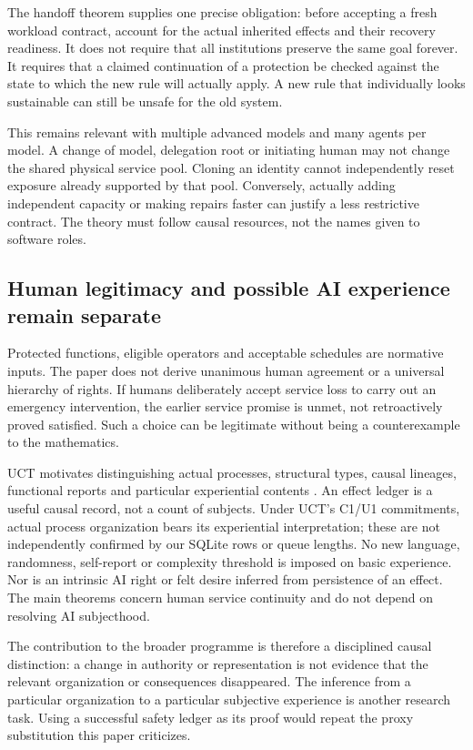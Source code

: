 The handoff theorem supplies one precise obligation: before accepting a fresh workload contract, account for the actual inherited effects and their recovery readiness. It does not require that all institutions preserve the same goal forever. It requires that a claimed continuation of a protection be checked against the state to which the new rule will actually apply. A new rule that individually looks sustainable can still be unsafe for the old system.

This remains relevant with multiple advanced models and many agents per model. A change of model, delegation root or initiating human may not change the shared physical service pool. Cloning an identity cannot independently reset exposure already supported by that pool. Conversely, actually adding independent capacity or making repairs faster can justify a less restrictive contract. The theory must follow causal resources, not the names given to software roles.

\subsection{Human legitimacy and possible AI experience remain separate}
Protected functions, eligible operators and acceptable schedules are normative inputs. The paper does not derive unanimous human agreement or a universal hierarchy of rights. If humans deliberately accept service loss to carry out an emergency intervention, the earlier service promise is unmet, not retroactively proved satisfied. Such a choice can be legitimate without being a counterexample to the mathematics.

UCT motivates distinguishing actual processes, structural types, causal lineages, functional reports and particular experiential contents \cite{uct}. An effect ledger is a useful causal record, not a count of subjects. Under UCT's C1/U1 commitments, actual process organization bears its experiential interpretation; these are not independently confirmed by our SQLite rows or queue lengths. No new language, randomness, self-report or complexity threshold is imposed on basic experience. Nor is an intrinsic AI right or felt desire inferred from persistence of an effect. The main theorems concern human service continuity and do not depend on resolving AI subjecthood.

The contribution to the broader programme is therefore a disciplined causal distinction: a change in authority or representation is not evidence that the relevant organization or consequences disappeared. The inference from a particular organization to a particular subjective experience is another research task. Using a successful safety ledger as its proof would repeat the proxy substitution this paper criticizes.

